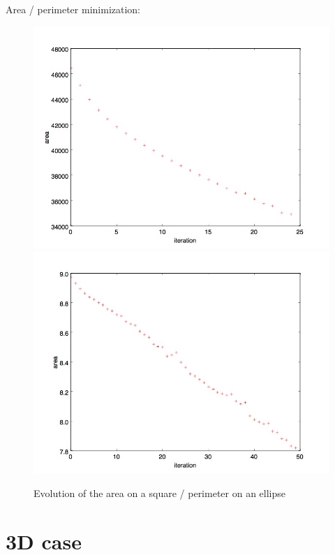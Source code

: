 \documentclass{beamer}
\begin{document}
\begin{frame}
    Area / perimeter minimization:
    \begin{figure}
        \centering
        \includegraphics[scale=0.2]{img/values-square-area}
        \includegraphics[scale=0.2]{img/values-ellipse-perimeter}
        \caption{Evolution of the area on a square / perimeter on an ellipse}
    \end{figure}
\end{frame}

\section{3D case}
\end{document}
